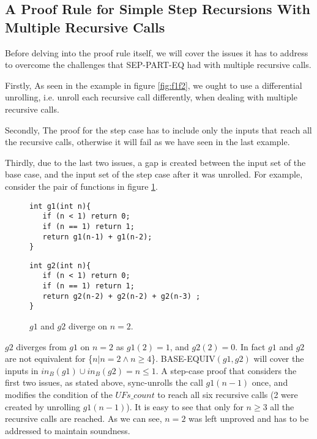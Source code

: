 \subsection{A Proof Rule for Simple Step Recursions With Multiple Recursive Calls}
\label{sec:adaptstep}
Before delving into the proof rule itself, we will cover the issues it has to address to overcome the challenges that SEP-PART-EQ had with multiple recursive calls.

Firstly, As seen in the example in figure \ref{fig:f1f2}, we ought to use a differential unrolling, i.e. unroll each recursive call differently, when dealing with multiple recursive calls.

Secondly, The proof for the step case has to include only the inputs that reach all the recursive calls, otherwise it will fail as we have seen in the last example.

Thirdly, due to the last two issues, a gap is created between the input set of the base case, and the input set of the step case after it was unrolled. For example, consider the pair of functions in figure \ref{fig:g1g2neq}.
\begin{figure}[h]
\begin{center}
\begin{minipage}{7 cm}
\begin{lstlisting}
int g1(int n){
   if (n < 1) return 0;
   if (n == 1) return 1; 
   return g1(n-1) + g1(n-2);
}
\end{lstlisting}
\end{minipage}
\begin{minipage}{7 cm}
\begin{lstlisting}
int g2(int n){
   if (n < 1) return 0;
   if (n == 1) return 1; 
   return g2(n-2) + g2(n-2) + g2(n-3) ;
}
\end{lstlisting}
\end{minipage}
\caption{$g1$ and $g2$ diverge on $n=2$.}
\label{fig:g1g2neq}
\end{center}
\end{figure}
$g2$ diverges from $g1$ on $n=2$ as $g1(2) = 1$, and $g2(2) = 0$. In fact $g1$ and $g2$ are not equivalent for \{$n | n = 2 \wedge n \geq 4$\}. BASE-EQUIV$(g1,g2)$ will cover the inputs in $in_B(g1) \cup in_B(g2) = {n \leq 1}$. A step-case proof that considers the first two issues, as stated above, sync-unrolls the call $g1(n-1)$ once, and modifies the condition of the $UFs\_count$ to reach all six recursive calls (2 were created by unrolling $g1(n-1)$). It is easy to see that only for $n \geq 3$ all the recursive calls are reached. As we can see, $n = 2$ was left unproved and has to be addressed to maintain soundness. 

